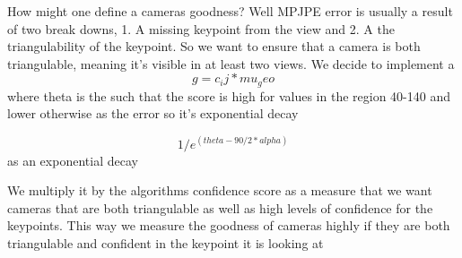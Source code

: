 How might one define a cameras goodness? Well MPJPE error is usually a result of two break downs, 1. A missing keypoint from the view and 2. A the triangulability of the keypoint. So we want to ensure that a camera is both triangulable, meaning it's visible in at least two views. 
We decide to implement a $$g = c_ij * mu_geo$$ where theta is the such that the score is high for values in the region 40-140 and lower otherwise as the error so it's exponential decay

$$1/e^(theta-90/2*alpha)$$ as an exponential decay 

We multiply it by the algorithms confidence score as a measure that we want cameras that are both triangulable as well as high levels of confidence for the keypoints.
This way we measure the goodness of cameras highly if they are both triangulable and confident in the keypoint it is looking at 